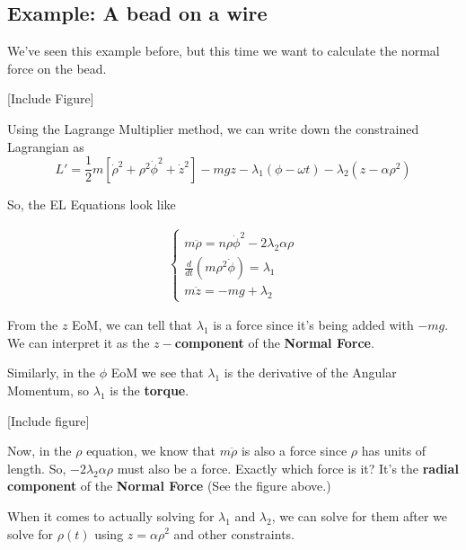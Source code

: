 \documentclass[11pt]{article}
\begin{document}
\vskip 1cm
\subsection{Example: A bead on a wire}

\vskip 0.5cm
We've seen this example before, but this time we want to calculate the normal force on the bead.

\vskip 0.5cm
[Include Figure]

\vskip 0.5cm
Using the Lagrange Multiplier method, we can write down the constrained Lagrangian as 
\[ L' = \frac{1}{2}m \left[ \dot{\rho}^2 + \rho^2 \dot{\phi}^2 + \dot{z}^2 \right] -mgz - \lambda_1 \left(\phi - \omega t\right) - \lambda_2 \left(z - \alpha \rho^2\right) \]

So, the EL Equations look like 

\begin{align*}
  \begin{cases}
    m \ddot{\rho} = n\rho \dot{\phi}^2 - 2 \lambda_2 \alpha \rho \\
    \frac{d}{dt} \left( m \rho^2 \dot{\phi} \right) = \lambda_1 \\
    m \ddot{z} = -mg + \lambda_2 
  \end{cases}
\end{align*}

\vskip 0.5cm
\begin{redbox}
  From the $z$ EoM, we can tell that $\lambda_1$ is a force since it's being added with $-mg$. We can interpret it as the \textbf{$z-$component} of the \textbf{Normal Force}.

  \vskip 0.5cm
  Similarly, in the $\phi$ EoM we see that $\lambda_1$ is the derivative of the Angular Momentum, so $\lambda_1$ is the \textbf{torque}.
\end{redbox}

[Include figure]

\begin{redbox}
  Now, in the $\rho$ equation, we know that $m\ddot{\rho}$ is also a force since $\rho$ has units of length. So, $-2\lambda_2 \alpha \rho$ must also be a force. Exactly which force is it? It's the \textbf{radial component} of the \textbf{Normal Force} (See the figure above.)
\end{redbox}

\vskip 0.5cm
\begin{bluebox}
  When it comes to actually solving for $\lambda_1$ and $\lambda_2$, we can solve for them after we solve for $\rho(t)$ using $z = \alpha \rho^2$ and other constraints.
\end{bluebox}
\end{document}
